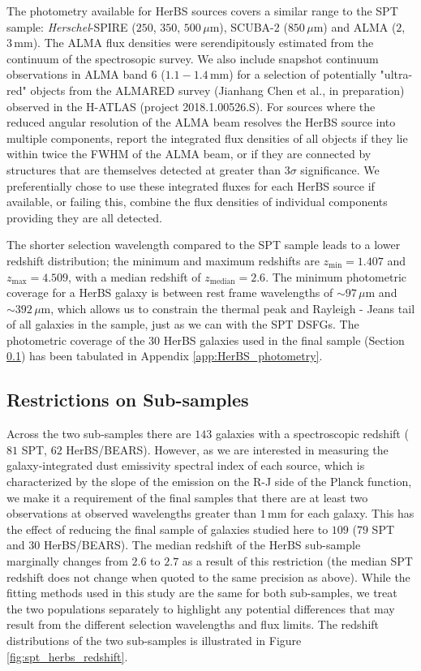 The photometry available for HerBS sources covers a similar range to the SPT sample: \textit{Herschel}-SPIRE ($250$, $350$, $500\,\mu$m), SCUBA-2 ($850\,\mu$m) and ALMA ($2$, $3\,$mm). The ALMA flux densities were serendipitously estimated from the continuum of the spectrosopic survey. We also include snapshot continuum observations in ALMA band 6 ($1.1 - 1.4\,$mm) for a selection of potentially "ultra-red" objects from the ALMARED survey (Jianhang Chen et al., in preparation) observed in the H-ATLAS (project 2018.1.00526.S). For sources where the reduced angular resolution of the ALMA beam resolves the HerBS source into multiple components, \citealt{Bendo_2023} report the integrated flux densities of all objects if they lie within twice the FWHM of the ALMA beam, or if they are connected by structures that are themselves detected at greater than 3$\sigma$ significance. We preferentially chose to use these integrated fluxes for each HerBS source if available, or failing this, combine the flux densities of individual components providing they are all detected.

The shorter selection wavelength compared to the SPT sample leads to a lower redshift distribution; the minimum and maximum redshifts are $z_{\textrm{min}} = 1.407$ and $z_{\textrm{max}} = 4.509$, with a median redshift of $z_{\textrm{median}} = 2.6$. The minimum photometric coverage for a HerBS galaxy is between rest frame wavelengths of $\sim 97\,\mu$m and $\sim 392\,\mu$m, which allows us to constrain the thermal peak and Rayleigh - Jeans tail of all galaxies in the sample, just as we can with the SPT DSFGs. The photometric coverage of the 30 HerBS galaxies used in the final sample (Section \ref{sec:restrictions_on_sample}) has been tabulated in Appendix \ref{app:HerBS_photometry}.

\subsection{Restrictions on Sub-samples}
\label{sec:restrictions_on_sample}

Across the two sub-samples there are $143$ galaxies with a spectroscopic redshift ($81$ SPT, $62$ HerBS/BEARS). However, as we are interested in measuring the galaxy-integrated dust emissivity spectral index of each source, which is characterized by the slope of the emission on the R-J side of the Planck function, we make it a requirement of the final samples that there are at least two observations at observed wavelengths greater than $1\,$mm for each galaxy. This has the effect of reducing the final sample of galaxies studied here to $109$ ($79$ SPT and $30$ HerBS/BEARS). The median redshift of the HerBS sub-sample marginally changes from $2.6$ to $2.7$ as a result of this restriction (the median SPT redshift does not change when quoted to the same precision as above). While the fitting methods used in this study are the same for both sub-samples, we treat the two populations separately to highlight any potential differences that may result from the different selection wavelengths and flux limits. The redshift distributions of the two sub-samples is illustrated in Figure \ref{fig:spt_herbs_redshift}.

